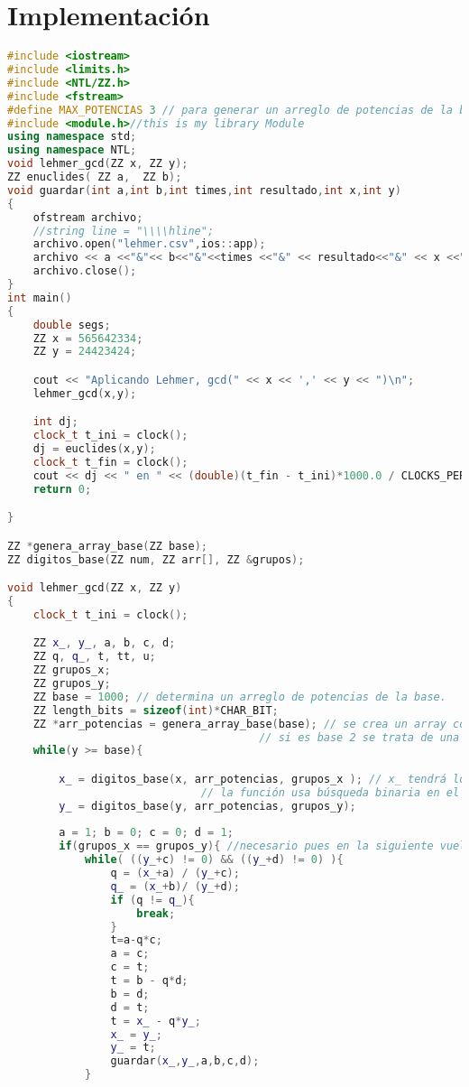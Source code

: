 \section{Implementaci\'on}
\begin{lstlisting}[language=C++]
#include <iostream>
#include <limits.h>
#include <NTL/ZZ.h>
#include <fstream>
#define MAX_POTENCIAS 3 // para generar un arreglo de potencias de la base
#include <module.h>//this is my library Module 
using namespace std;
using namespace NTL;
void lehmer_gcd(ZZ x, ZZ y);
ZZ enuclides( ZZ a,  ZZ b);
void guardar(int a,int b,int times,int resultado,int x,int y)
{
    ofstream archivo;
    //string line = "\\\\hline";
    archivo.open("lehmer.csv",ios::app);
    archivo << a <<"&"<< b<<"&"<<times <<"&" << resultado<<"&" << x <<"&" << y <<  "\\\\\\hline"<<endl;
    archivo.close();
}
int main()
{
    double segs;
    ZZ x = 565642334;
    ZZ y = 24423424;

    cout << "Aplicando Lehmer, gcd(" << x << ',' << y << ")\n";
    lehmer_gcd(x,y);

    int dj;
    clock_t t_ini = clock();
    dj = euclides(x,y);
    clock_t t_fin = clock();
    cout << dj << " en " << (double)(t_fin - t_ini)*1000.0 / CLOCKS_PER_SEC;
    return 0;

}

ZZ *genera_array_base(ZZ base);
ZZ digitos_base(ZZ num, ZZ arr[], ZZ &grupos);

void lehmer_gcd(ZZ x, ZZ y)
{
    clock_t t_ini = clock();

    ZZ x_, y_, a, b, c, d;
    ZZ q, q_, t, tt, u;
    ZZ grupos_x;
    ZZ grupos_y;
    ZZ base = 1000; // determina un arreglo de potencias de la base.
    ZZ length_bits = sizeof(int)*CHAR_BIT;
    ZZ *arr_potencias = genera_array_base(base); // se crea un array con las potencias de la base.
                                       // si es base 2 se trata de una forma especial (moviendo bits)
    while(y >= base){

        x_ = digitos_base(x, arr_potencias, grupos_x ); // x_ tendrá los dígitos más significativos que unidos serán <= a la base.
                              // la función usa búsqueda binaria en el array de potencias  de la base
        y_ = digitos_base(y, arr_potencias, grupos_y);
	
        a = 1; b = 0; c = 0; d = 1;
        if(grupos_x == grupos_y){ //necesario pues en la siguiente vuelta hay que asegurar que x e y tengan la misma cantidad d cifras
            while( ((y_+c) != 0) && ((y_+d) != 0) ){
                q = (x_+a) / (y_+c);
                q_ = (x_+b)/ (y_+d);
                if (q != q_){
                    break;
                }
                t=a-q*c;
                a = c;
                c = t;
                t = b - q*d;
                b = d;
                d = t;
                t = x_ - q*y_;
                x_ = y_;
                y_ = t;
                guardar(x_,y_,a,b,c,d);
            }
            

\end{lstlisting}
